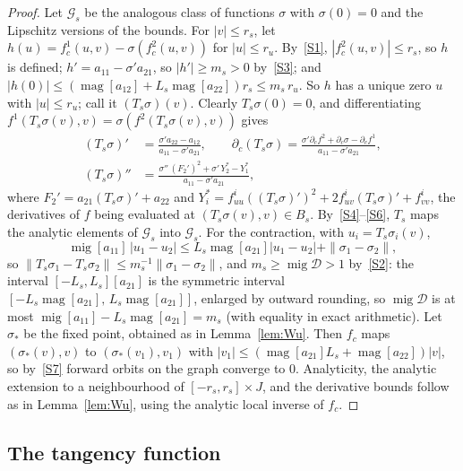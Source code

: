 \documentclass[11pt]{amsart}
\theoremstyle{definition}
\theoremstyle{remark}
\newcommand{\magn}{\operatorname{mag}}
\newcommand{\mig}{\operatorname{mig}}
\newcommand{\ival}[1]{[#1]}
\newcommand{\Dh}{\mathcal{D}}
\begin{document}
\begin{proof}
Let $\mathcal G_s$ be the analogous class of functions $\sigma$ with $\sigma(0)=0$ and the Lipschitz versions
of the bounds. For $|v|\le r_s$, let $h(u)=f^1_c(u,v)-\sigma(f^2_c(u,v))$ for $|u|\le r_u$. By~\ref{S1},
$|f^2_c(u,v)|\le r_s$, so $h$ is defined; $h'=a_{11}-\sigma'a_{21}$, so $|h'|\ge m_s>0$ by~\ref{S3}; and
$|h(0)|\le(\magn\ival{a_{12}}+L_s\magn\ival{a_{22}})r_s\le m_s\,r_u$. So $h$ has a unique zero $u$ with
$|u|\le r_u$; call it $(T_s\sigma)(v)$. Clearly $T_s\sigma(0)=0$, and differentiating
$f^1(T_s\sigma(v),v)=\sigma(f^2(T_s\sigma(v),v))$ gives
\begin{align*}
(T_s\sigma)'&=\frac{\sigma'a_{22}-a_{12}}{a_{11}-\sigma'a_{21}},\qquad
\partial_c(T_s\sigma)=\frac{\sigma'\partial_cf^2+\partial_c\sigma-\partial_cf^1}{a_{11}-\sigma'a_{21}},\\
(T_s\sigma)''&=\frac{\sigma''\,(F_2')^2+\sigma'\,Y_2^*-Y_1^*}{a_{11}-\sigma'a_{21}},
\end{align*}
where $F_2'=a_{21}(T_s\sigma)'+a_{22}$ and $Y_i^*=f^i_{uu}((T_s\sigma)')^2+2f^i_{uv}(T_s\sigma)'+f^i_{vv}$, the
derivatives of $f$ being evaluated at $(T_s\sigma(v),v)\in B_s$. By~\ref{S4}--\ref{S6}, $T_s$ maps the
analytic elements of $\mathcal G_s$ into $\mathcal G_s$. For the contraction, with $u_i=T_s\sigma_i(v)$,
\[
\mig\ival{a_{11}}\,|u_1-u_2|\le L_s\magn\ival{a_{21}}|u_1-u_2|+\|\sigma_1-\sigma_2\|,
\]
so $\|T_s\sigma_1-T_s\sigma_2\|\le m_s^{-1}\|\sigma_1-\sigma_2\|$, and $m_s\ge\mig\Dh>1$ by~\ref{S2}: the interval $[-L_s,L_s]\ival{a_{21}}$ is the symmetric interval
$[-L_s\magn\ival{a_{21}},\,L_s\magn\ival{a_{21}}]$, enlarged by outward rounding, so $\mig\Dh$ is at most
$\mig\ival{a_{11}}-L_s\magn\ival{a_{21}}=m_s$ (with equality in exact arithmetic). Let
$\sigma_*$ be the fixed point, obtained as in Lemma~\ref{lem:Wu}. Then $f_c$ maps $(\sigma_*(v),v)$ to
$(\sigma_*(v_1),v_1)$ with $|v_1|\le(\magn\ival{a_{21}}L_s+\magn\ival{a_{22}})|v|$, so by~\ref{S7} forward
orbits on the graph converge to $0$. Analyticity, the analytic extension to a neighbourhood of
$[-r_s,r_s]\times J$, and the derivative bounds follow as in Lemma~\ref{lem:Wu}, using the analytic local
inverse of $f_c$.
\end{proof}

\subsection{The tangency function}
\end{document}

